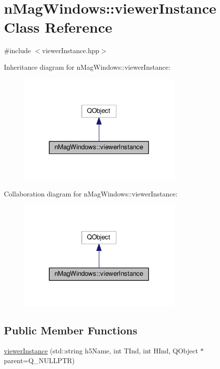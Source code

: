 \hypertarget{classnMagWindows_1_1viewerInstance}{}\section{n\+Mag\+Windows\+:\+:viewer\+Instance Class Reference}
\label{classnMagWindows_1_1viewerInstance}


{\ttfamily \#include $<$viewer\+Instance.\+hpp$>$}



Inheritance diagram for n\+Mag\+Windows\+:\+:viewer\+Instance\+:
\nopagebreak
\begin{figure}[H]
\begin{center}
\leavevmode
\includegraphics[width=233pt]{d6/d37/classnMagWindows_1_1viewerInstance__inherit__graph}
\end{center}
\end{figure}


Collaboration diagram for n\+Mag\+Windows\+:\+:viewer\+Instance\+:
\nopagebreak
\begin{figure}[H]
\begin{center}
\leavevmode
\includegraphics[width=233pt]{d1/d85/classnMagWindows_1_1viewerInstance__coll__graph}
\end{center}
\end{figure}
\subsection*{Public Member Functions}
\begin{DoxyCompactItemize}
\item 
\hyperlink{classnMagWindows_1_1viewerInstance_ad6cc22c4ff86766ab0cae5986164391b}{viewer\+Instance} (std\+::string h5\+Name, int T\+Ind, int H\+Ind, Q\+Object $\ast$parent=Q\+\_\+\+N\+U\+L\+L\+P\+TR)
\end{DoxyCompactItemize}


